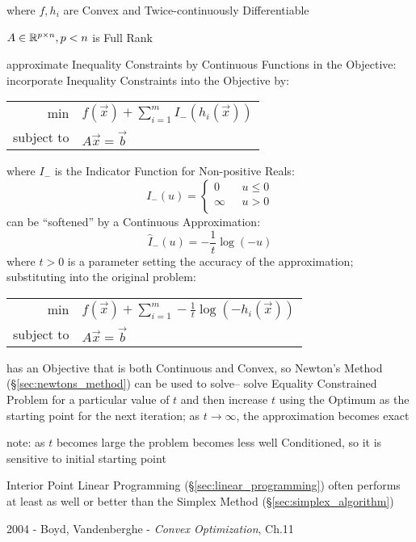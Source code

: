 where $f, h_i$ are Convex and Twice-continuously Differentiable

$A \in \mathbb{R}^{p \times n}, p < n$ is Full Rank

approximate Inequality Constraints by Continuous Functions in the Objective:
incorporate Inequality Constraints into the Objective by:

\begin{tabular}{r l}
  $\mathrm{min}$ & $f(\vec{x}) + \sum_{i=1}^m I_{-} (h_i(\vec{x}))$ \\
  subject to     & $A\vec{x} = \vec{b}$ \\
\end{tabular}

where $I_{-}$ is the Indicator Function for Non-positive Reals:
\[
  I_{-}(u) = \begin{cases}
    0       & \ \ \ u \leq 0 \\
    \infty  & \ \ \ u >    0 \\
  \end{cases}
\]
can be ``softened'' by a Continuous Approximation:
\[
  \hat{I}_{-}(u) = -\frac{1}{t} \log (-u)
\]
where $t > 0$ is a parameter setting the accuracy of the approximation;
substituting into the original problem:

\begin{tabular}{r l}
  $\mathrm{min}$ &
    $f(\vec{x}) + \sum_{i=1}^m -\frac{1}{t} \log(-h_i(\vec{x}))$ \\
  subject to     & $A\vec{x} = \vec{b}$ \\
\end{tabular}

has an Objective that is both Continuous and Convex, so Newton's Method
(\S\ref{sec:newtons_method}) can be used to solve-- solve Equality Constrained
Problem for a particular value of $t$ and then increase $t$ using the Optimum
as the starting point for the next iteration; as $t \rightarrow \infty$, the
approximation becomes exact

note: as $t$ becomes large the problem becomes less well Conditioned, so it is
sensitive to initial starting point

\fist Interior Point Linear Programming (\S\ref{sec:linear_programming}) often
performs at least as well or better than the Simplex Method
(\S\ref{sec:simplex_algorithm})


\asterism

2004 - Boyd, Vandenberghe - \emph{Convex Optimization}, Ch.11

